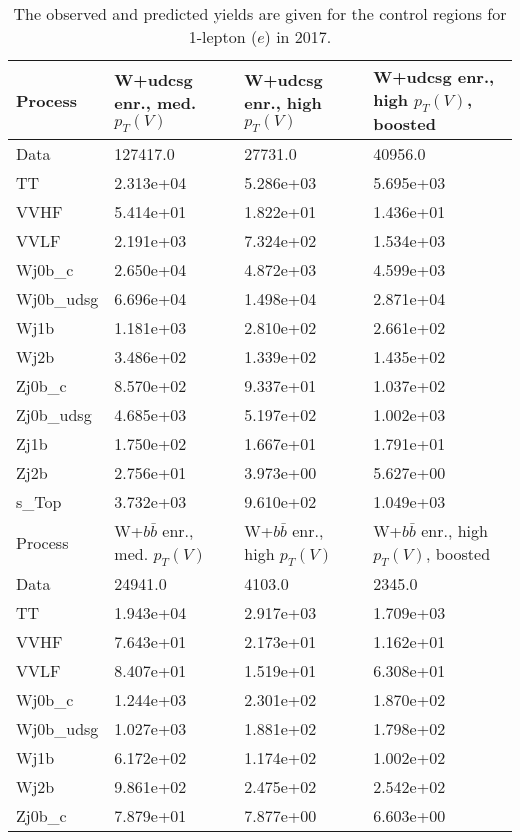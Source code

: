 \begin{table}
\centering
\caption[2017 1-lepton ($e$) control region yields]{
                  The observed and predicted yields are given for the
                  control regions for 1-lepton ($e$) in 2017.
                  }
{\footnotesize
\begin{tabularx}{0.8\textwidth}{|X|X|X|X|}
\hline
Process & W+udcsg enr., med. $p_{T}(V)$ & W+udcsg enr., high $p_{T}(V)$ & W+udcsg enr., high $p_{T}(V)$, boosted \\
\hline
Data & 127417.0 & 27731.0 & 40956.0 \\
\hline
TT & 2.313e+04 & 5.286e+03 & 5.695e+03 \\
VVHF & 5.414e+01 & 1.822e+01 & 1.436e+01 \\
VVLF & 2.191e+03 & 7.324e+02 & 1.534e+03 \\
Wj0b\_c & 2.650e+04 & 4.872e+03 & 4.599e+03 \\
Wj0b\_udsg & 6.696e+04 & 1.498e+04 & 2.871e+04 \\
Wj1b & 1.181e+03 & 2.810e+02 & 2.661e+02 \\
Wj2b & 3.486e+02 & 1.339e+02 & 1.435e+02 \\
Zj0b\_c & 8.570e+02 & 9.337e+01 & 1.037e+02 \\
Zj0b\_udsg & 4.685e+03 & 5.197e+02 & 1.002e+03 \\
Zj1b & 1.750e+02 & 1.667e+01 & 1.791e+01 \\
Zj2b & 2.756e+01 & 3.973e+00 & 5.627e+00 \\
s\_Top & 3.732e+03 & 9.610e+02 & 1.049e+03 \\
\hline
\hline
Process & W+$b\bar{b}$ enr., med. $p_{T}(V)$ & W+$b\bar{b}$ enr., high $p_{T}(V)$ & W+$b\bar{b}$ enr., high $p_{T}(V)$, boosted \\
\hline
Data & 24941.0 & 4103.0 & 2345.0 \\
\hline
TT & 1.943e+04 & 2.917e+03 & 1.709e+03 \\
VVHF & 7.643e+01 & 2.173e+01 & 1.162e+01 \\
VVLF & 8.407e+01 & 1.519e+01 & 6.308e+01 \\
Wj0b\_c & 1.244e+03 & 2.301e+02 & 1.870e+02 \\
Wj0b\_udsg & 1.027e+03 & 1.881e+02 & 1.798e+02 \\
Wj1b & 6.172e+02 & 1.174e+02 & 1.002e+02 \\
Wj2b & 9.861e+02 & 2.475e+02 & 2.542e+02 \\
Zj0b\_c & 7.879e+01 & 7.877e+00 & 6.603e+00 \\

\end{tabularx}}
\end{table}
